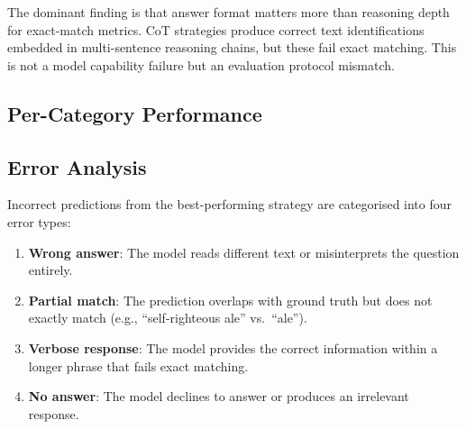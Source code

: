 \documentclass[11pt]{article}
\begin{document}

The dominant finding is that answer format matters more than reasoning depth for exact-match metrics. CoT strategies produce correct text identifications embedded in multi-sentence reasoning chains, but these fail exact matching. This is not a model capability failure but an evaluation protocol mismatch.


\subsection{Per-Category Performance}



\subsection{Error Analysis}

Incorrect predictions from the best-performing strategy are categorised into four error types:

\begin{enumerate}[nosep]
  \item \textbf{Wrong answer}: The model reads different text or misinterprets the question entirely.
  \item \textbf{Partial match}: The prediction overlaps with ground truth but does not exactly match (e.g., ``self-righteous ale'' vs.\ ``ale'').
  \item \textbf{Verbose response}: The model provides the correct information within a longer phrase that fails exact matching.
  \item \textbf{No answer}: The model declines to answer or produces an irrelevant response.
\end{enumerate}

\end{document}
